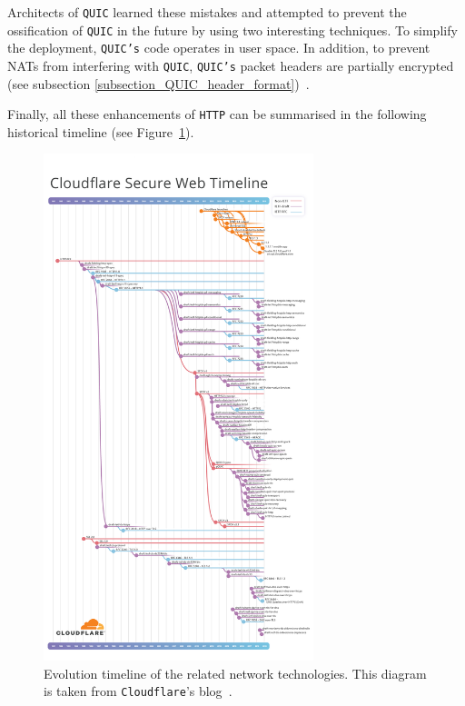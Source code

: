 \documentclass[12pt,a4paper,twoside,openright]{report}
\begin{document}
Architects of \texttt{QUIC} learned these mistakes and attempted to prevent the ossification of \texttt{QUIC} in the future by using two interesting techniques.
To simplify the deployment, \texttt{QUIC's} code operates in user space.
In addition, to prevent NATs from interfering with \texttt{QUIC}, \texttt{QUIC's} packet headers are partially encrypted (see subsection \ref{subsection_QUIC_header_format})~\cite{bib_Netdev_0x13_QUIC_Tutorial}.

Finally, all these enhancements of \texttt{HTTP} can be summarised in the following historical timeline (see Figure~\ref{fig:cf-secure-web-timeline}).
    \begin{figure}[H]
    \centering
    \includegraphics[width=0.7\textwidth]{figs/cf-secure-web-timeline-1.png}
    \caption[Evolution timeline of the related network technologies]{Evolution timeline of the related network technologies. This diagram is taken from \texttt{Cloudflare}'s blog~\cite{http-3-from-root-to-tip}.}
    \label{fig:cf-secure-web-timeline}
    \end{figure}
\end{document}
